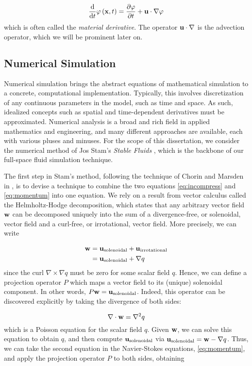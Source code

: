 \begin{equation}
\frac{\mathrm{d}}{\mathrm{d}t}\varphi\left(\mathbf{x}, t\right) = \frac{\partial \varphi}{\partial t} + \mathbf{u} \cdot \nabla \varphi
\end{equation}
which is often called the {\em material derivative}. The operator $\mathbf{u} \cdot \nabla$ is the advection operator, which we will be prominent later on.

\subsection{Numerical Simulation}
Numerical simulation brings the abstract equations of mathematical simulation to a concrete, computational implementation. Typically, this involves discretization of any continuous parameters in the model, such as time and 
space. As such, idealized concepts such as spatial and time-dependent derivatives must be approximated. Numerical analysis is a broad and rich field in applied mathematics and engineering, and many different approaches
are available, each with various pluses and minuses. For the scope of this dissertation, we consider the numerical method of Jos Stam's {\em Stable Fluids} \cite{Stam99}, which is the backbone of our full-space fluid simulation technique. 

The first step in Stam's method, following the technique of Chorin and Marsden in \cite{chorin1990mathematical}, is to devise a technique to combine the two equations \ref{eq:incompress} and \ref{eq:momentum} into one equation. We rely on a result from vector calculus called the Helmholtz-Hodge decomposition, which states that any arbitrary vector field $\mathbf{w}$ can be decomposed uniquely into the sum of a divergence-free, or solenoidal, vector field and a curl-free, or irrotational, vector field. More precisely,
we can write

\begin{align}
\label{eq:hh}
\mathbf{w} &= \mathbf{u}_{\text{solenoidal}} + \mathbf{u}_{\text{irrotational}}\\
        &= \mathbf{u}_{\text{solenoidal}} + \nabla q
\end{align}
since the curl $\nabla \times \nabla q$ must be zero for some scalar field $q$. Hence, we can define a projection operator $P$ which maps a vector field to its (unique) solenoidal component. In other words,
$P \mathbf{w} = \mathbf{u}_{\text{solenoidal}}$. Indeed, this operator can be discovered explicitly by taking the divergence of both sides:

\begin{equation}
\nabla \cdot \mathbf{w} = \nabla^2 q
\end{equation}
which is a Poisson equation for the scalar field $q$. Given $\mathbf{w}$, we can solve this equation to obtain $q$, and then compute $\mathbf{u}_{\text{solenoidal}}$ via $\mathbf{u}_{\text{solenoidal}} = \mathbf{w} - \nabla q$. Thus, we can take the
second equation in the Navier-Stokes equations, \ref{eq:momentum}, and apply the projection operator $P$ to both sides, obtaining

